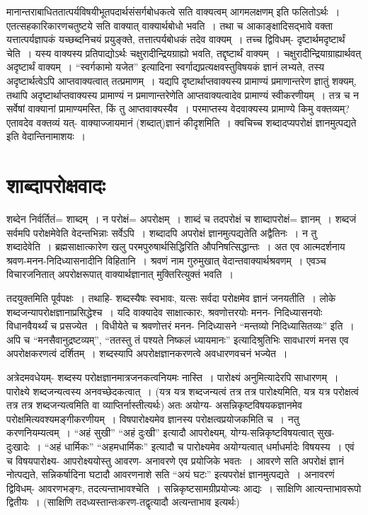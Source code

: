 {मानान्तराबाधिततात्पर्यविषयीभूतपदार्थसंसर्गबोधकत्वे सति वाक्यत्वम् आगमलक्षणम् इति फलितोऽर्थः~। एतत्सहकारिकारणचतुष्टये सति वाक्यात् वाक्यार्थबोधो भवति~। तथा च आकाङ्क्षादिसद्भावे वक्ता यत्तात्पर्यज्ञापकं यच्छब्दनिचयं प्रयुङ्क्ते, तत्तात्पर्यबोधकं तदेव वाक्यम्~। तच्च द्विविधम्- दृष्टार्थमदृष्टार्थं चेति~। यस्य वाक्यस्य प्रतिपाद्योऽर्थः चक्षुरादीन्द्रियग्राह्यो भवति, तद्दृष्टार्थं वाक्यम्~। चक्षुरादीन्द्रियाग्राह्यार्थवत् अदृष्टार्थं वाक्यम्~। “स्वर्गकामो यजेत” इत्यादिना स्वर्गाद्यप्रत्यक्षवस्तुविषयकं ज्ञानं लभ्यते, तस्य अदृष्टार्थत्वेऽपि आप्तवाक्यत्वात् तत्प्रमाणम्~। यद्यपि दृष्टार्थाप्तवाक्यस्य प्रामाण्यं प्रमाणान्तरेण ज्ञातुं शक्यम्, तथापि अदृष्टार्थाप्तवाक्यस्य प्रामाण्यं न प्रमाणान्तरेणेति आप्तवाक्यत्वादेव प्रामाण्यं स्वीकरणीयम्~। तत्र च न सर्वेषां वाक्यानां प्रामाण्यमस्ति, किं तु आप्तवाक्यस्यैव~। परमाप्तस्य वेदवाक्यस्य प्रामाण्ये किमु वक्तव्यम्? एतावदेव वक्तव्यं यत्- वाक्याज्जायमानं (शब्दात्)ज्ञानं कीदृशमिति~। क्वचिच्च शब्दादप्यपरोक्षं ज्ञानमुत्पद्यते इति वेदान्तिनामाशयः~। 

\section*{शाब्दापरोक्षवादः}

शब्देन निर्वर्तितं= शाब्दम्~। न परोक्षं= अपरोक्षम्~। शाब्दं च तदपरोक्षं च शाब्दापरोक्षं= ज्ञानम्~। शब्दजं सर्वमपि परोक्षमेवेति वेदन्तभिन्नाः सर्वेऽपि~। शब्दादपि अपरोक्षं ज्ञानमुत्पद्यतेति अद्वैतिनः~। न तु शब्दादेवेति~। ब्रह्मसाक्षात्कारेण खलु परमपुरुषार्थसिद्धिरिति औपनिषत्सिद्धान्तः~। अत एव आत्मदर्शनाय श्रवण-मनन-निदिध्यासनादीनि विहितानि~। श्रवणं नाम गुरुमुखात् वेदान्तवाक्यार्थश्रवणम्~। एवञ्च विचारजनितात् अपरोक्षरूपात् वाक्यार्थज्ञानात् मुक्तिरित्युक्तं भवति~। 

तदयुक्तमिति पूर्वपक्षः~। तथाहि- शब्दस्यैषः स्वभावः, यत्सः सर्वदा परोक्षमेव ज्ञानं जनयतीति~। लोके शब्दजन्यापरोक्षज्ञानाप्रसिद्धेश्च~। यदि वाक्यादेव साक्षात्कारः, श्रवणोत्तरयोः मनन- निदिध्यासनयोः विधानवैयर्थ्यं च प्रसज्येत~। विधीयेते च श्रवणोत्तरं मनन- निदिध्यासने “मन्तव्यो निदिध्यासितव्यः” इति~। अपि च “मनसैवानुद्रष्टव्यम्”, “ततस्तु तं पश्यते निष्कलं ध्यायमानः” इत्यादिश्रुतिभिः सावधारणं मनस एव अपरोक्षकरणत्वं दर्शितम्~। शब्दस्यापि अपरोक्षज्ञानकरणत्वे अवधारणवचनं भज्येत~। 

अत्रेदमवधेयम्- शब्दस्य परोक्षज्ञानमात्रजनकत्वनियमः नास्ति~। पारोक्ष्यं अनुमित्यादेरपि साधारणम्~। पारोक्ष्ये शब्दजन्यत्वस्य अनवच्छेदकत्वात्~। (यत्र यत्र शब्दजन्यत्वं तत्र तत्र पारोक्ष्यमिति, यत्र यत्र परोक्षत्वं तत्र तत्र शब्दजन्यत्वमिति वा व्याप्तिर्नास्तीत्यर्थः) अतः अयोग्य- असन्निकृष्टविषयकज्ञानमेव परोक्षमित्यवश्यमङ्गीकरणीयम्~। विषपारोक्ष्यमेव ज्ञानस्य परोक्षत्वप्रयोजकमिति च~। नतु करणनियम्यत्वम्~। “अहं सुखी” “अहं दुःखी” इत्यादौ आपरोक्ष्यम्, योग्य-सन्निकृष्टविषयत्वात् सुख-दुःखादेः~। “अहं धार्मिकः” “अहमधार्मिकः” इत्यादौ च पारोक्ष्यमेव अयोग्यत्वात् धर्माधर्मादेः विषयस्य~। एवं च विषयपारोक्ष्य- आपरोक्ष्ययोस्तु आवरण- अनावरणे एव प्रयोजिके भवतः~। आवरणे सति अपरोक्षं ज्ञानं नोत्पद्यते, सन्निकर्षादिना घटादौ आवरणनाशे सति “अयं घटः” इत्यपरोक्षं ज्ञानमुत्पद्यते~। अनावरणं द्विविधम्- आवरणभङ्गः, तदत्यन्ताभावश्चेति~। सन्निकृष्टसामग्रीप्रयोज्यः आद्यः~। साक्षिणि आत्यन्ताभावरूपो द्वितीयः~। (साक्षिणि तदध्यस्तान्तःकरण-तद्वृत्यादौ अत्यन्ताभाव इत्यर्थः)

}
